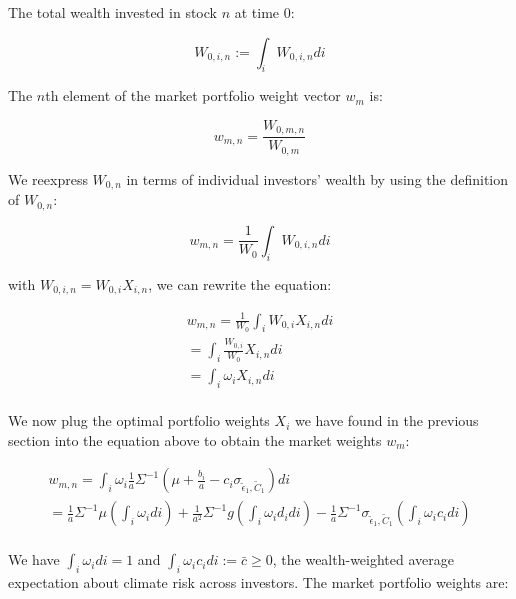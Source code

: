 The total wealth invested in stock $n$ at time 0:


\begin{equation}
    W_{0,i,n} := \int_i W_{0,i,n} di 
\end{equation}

The $n$th element of the market portfolio weight vector $w_m$ is:

\begin{equation}
    w_{m,n} = \frac{W_{0,m,n}}{W_{0,m}}
\end{equation}

We reexpress $W_{0,n}$ in terms of individual investors' wealth 
by using the definition of $W_{0,n}$:

\begin{equation}
    w_{m,n} = \frac{1}{W_0} \int_i W_{0,i,n}di 
\end{equation}

with $W_{0,i,n} = W_{0,i}X_{i,n}$, we can rewrite 
the equation: 

\begin{equation}
    \begin{aligned}
    w_{m,n} = \frac{1}{W_0} \int_i W_{0,i}X_{i,n}di \\
    = \int_i \frac{W_{0,i}}{W_0}X_{i,n}di \\
    = \int_i \omega_i X_{i,n}di \\
    \end{aligned}
\end{equation}

We now plug the optimal portfolio weights $X_i$ we have found 
in the previous section into the equation above
to obtain the market weights $w_m$:

\begin{equation}
    \begin{aligned}
        w_{m,n} = \int_i \omega_i \frac{1}{a} \Sigma^{-1} ( \mu + \frac{b_i}{a} - c_i \sigma_{\tilde{\epsilon}_1, \tilde{C}_1}) di \\
        = \frac{1}{a} \Sigma^{-1} \mu (\int_i \omega_i di) + \frac{1}{a^2} \Sigma^{-1}g (\int_i \omega_i d_i di) - \frac{1}{a} \Sigma^{-1} \sigma_{\tilde{\epsilon}_1, \tilde{C}_1} (\int_i \omega_i c_i di) \\
    \end{aligned}
\end{equation}

We have $\int_i \omega_i di = 1$ and $\int_i \omega_i c_i di := \bar{c} \geq 0$,
the wealth-weighted average expectation about climate risk 
across investors. The market portfolio weights are:

